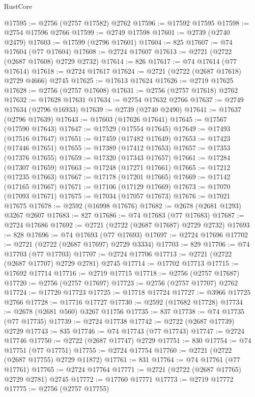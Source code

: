 \begin{lexlean}{RustCore}
\begin{coremodule}
@17595 := @2756 (@2757 @17582) @2762
@17596 := @17592 @17595
@17598 := @2754 @17596 @2766
@17599 := @2749 @17598
@17601 := @2739 (@2740 @2479)
@17603 := @17599 (@2796 @17601)
@17604 := 825
@17607 := @74 @17604 (@77 @17604)
@17608 := @2724 @17607
@17613 := @2721 (@2722 (@2687 @17608) @2729 @2732)
@17614 := 826
@17617 := @74 @17614 (@77 @17614)
@17618 := @2724 @17617
@17624 := @2721 (@2722 (@2687 @17618) @2729 @4666) @2745
@17625 := @17613 @17624
@17626 := @2719 @17625
@17628 := @2756 (@2757 @17608)
@17631 := @2756 (@2757 @17618) @2762
@17632 := @17628 @17631
@17634 := @2754 @17632 @2766
@17637 := @2749 @17634 (@2796 @16933)
@17639 := @2739 (@2740 @2490)
@17641 := @17637 (@2796 @17639)
@17643 := @17603 (@17626 @17641)
@17645 := @17567 (@17590 @17643)
@17647 := @17529 (@17554 @17645)
@17649 := @17493 (@17516 @17647)
@17651 := @17459 (@17482 @17649)
@17653 := @17423 (@17446 @17651)
@17655 := @17389 (@17412 @17653)
@17657 := @17353 (@17376 @17655)
@17659 := @17320 (@17343 @17657)
@17661 := @17284 (@17307 @17659)
@17663 := @17248 (@17271 @17661)
@17665 := @17212 (@17235 @17663)
@17667 := @17178 (@17201 @17665)
@17669 := @17142 (@17165 @17667)
@17671 := @17106 (@17129 @17669)
@17673 := @17070 (@17093 @17671)
@17675 := @17034 (@17057 @17673)
@17676 := @17021 @17675
@17678 := @2592 (@16998 @17676)
@17682 := @2678 (@2681 @1293) @3267 @2607
@17683 := 827
@17686 := @74 @17683 (@77 @17683)
@17687 := @2724 @17686
@17692 := @2721 (@2722 (@2687 @17687) @2729 @2732)
@17693 := 828
@17696 := @74 @17693 (@77 @17693)
@17697 := @2724 @17696
@17702 := @2721 (@2722 (@2687 @17697) @2729 @3334)
@17703 := 829
@17706 := @74 @17703 (@77 @17703)
@17707 := @2724 @17706
@17713 := @2721 (@2722 (@2687 @17707) @2729 @2781) @2745
@17714 := @17702 @17713
@17715 := @17692 @17714
@17716 := @2719 @17715
@17718 := @2756 (@2757 @17687)
@17720 := @2756 (@2757 @17697)
@17723 := @2756 (@2757 @17707) @2762
@17724 := @17720 @17723
@17725 := @17718 @17724
@17727 := @3966 @17725 @2766
@17728 := @17716 @17727
@17730 := @2592 (@17682 @17728)
@17734 := @2678 (@2681 @560) @3267 @11756
@17735 := 837
@17738 := @74 @17735 (@77 @17735)
@17739 := @2724 @17738
@17742 := @2722 (@2687 @17739) @2729
@17743 := 835
@17746 := @74 @17743 (@77 @17743)
@17747 := @2724 @17746
@17750 := @2722 (@2687 @17747) @2729
@17751 := 830
@17754 := @74 @17751 (@77 @17751)
@17755 := @2724 @17754
@17760 := @2721 (@2722 (@2687 @17755) @2729 @11872)
@17761 := 831
@17764 := @74 @17761 (@77 @17761)
@17765 := @2724 @17764
@17771 := @2721 (@2722 (@2687 @17765) @2729 @2781) @2745
@17772 := @17760 @17771
@17773 := @2719 @17772
@17775 := @2756 (@2757 @17755)

\end{coremodule}
\end{lexlean}
